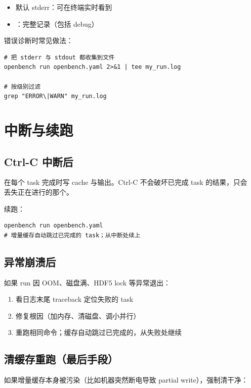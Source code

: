 \begin{itemize}
  \item 默认 stderr：可在终端实时看到
  \item {}：完整记录（包括 debug）
\end{itemize}

错误诊断时常见做法：

\begin{verbatim}
# 把 stderr 与 stdout 都收集到文件
openbench run openbench.yaml 2>&1 | tee my_run.log

# 按级别过滤
grep "ERROR\|WARN" my_run.log
\end{verbatim}

\section{中断与续跑}

\subsection{Ctrl-C 中断后}

\openbench{} 在每个 task 完成时写 cache 与输出。Ctrl-C 不会破坏已完成 task 的结果，只会丢失正在进行的那个。

续跑：

\begin{verbatim}
openbench run openbench.yaml
# 增量缓存自动跳过已完成的 task；从中断处续上
\end{verbatim}

\subsection{异常崩溃后}

如果 run 因 OOM、磁盘满、HDF5 lock 等异常退出：

\begin{enumerate}
  \item 看日志末尾 traceback 定位失败的 task
  \item 修复根因（加内存、清磁盘、调小并行）
  \item 重跑相同命令；缓存自动跳过已完成的，从失败处继续
\end{enumerate}

\subsection{清缓存重跑（最后手段）}

如果增量缓存本身被污染（比如机器突然断电导致 partial write），强制清干净：


